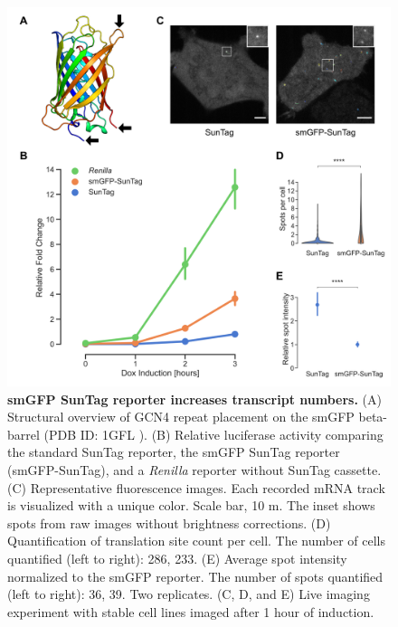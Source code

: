 \begin{figure}[h]
    \centering
    \includegraphics[width=\linewidth]{images/figure6}
    \caption{\textbf{smGFP SunTag reporter increases transcript numbers.}
        (A) Structural overview of GCN4 repeat placement on the smGFP beta-barrel (PDB ID: 1GFL \cite{yang_molecular_1996}).
        (B) Relative luciferase activity comparing the standard SunTag reporter,
            the smGFP SunTag reporter (smGFP-SunTag), and a \textit{Renilla} reporter without SunTag cassette.
        (C) Representative fluorescence images. Each recorded mRNA track is 
            visualized with a unique color. Scale bar, 10 \textmu m.
            The inset shows spots from raw images without brightness corrections.
        (D) Quantification of translation site count per cell.
            The number of cells quantified (left to right): 286, 233.
        (E) Average spot intensity normalized to the smGFP reporter.
            The number of spots quantified (left to right): 36, 39. Two replicates.
        (C, D, and E) Live imaging experiment with stable cell lines imaged after 1 hour
            of induction.
    }
    \label{fig:spaghetti}
\end{figure}